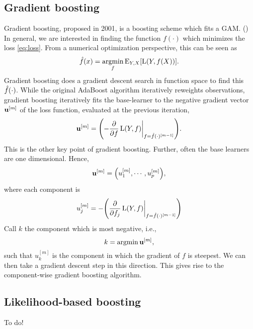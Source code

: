 \subsection{Gradient boosting}
Gradient boosting, proposed in 2001, is a boosting scheme which fits a GAM. (\cite{friedman2001}) In general, we are interested in finding the function $f(\cdot)$ which minimizes the loss \eqref{eq:loss}. From a numerical optimization perspective, this can be seen as
\begin{equation*}
    \hat{f}(x)=\underset{f}{\operatorname{argmin}}\,{\operatorname{E}_{Y,X}[\operatorname{L}(Y,f(X))]}.
\end{equation*}
Gradient boosting does a gradient descent search in function space to find this $\hat{f}(\cdot)$. While the original AdaBoost algorithm iteratively reweights observations, gradient boosting iteratively fits the base-learner to the negative gradient vector $\mathbf{u}^{[m]}$ of the loss function, evaluated at the previous iteration,
\begin{equation*}
    \u^{[m]}=\p*{-\frac{\pd}{\pd f}\loss(Y,f)\at_{f=\fh(\cdot)^{[m-1]}}}.
\end{equation*}
This is the other key point of gradient boosting. Further, often the base learners are one dimensional. Hence,
\begin{equation*}
    \u^{[m]}=\p*{u_1^{[m]},\cdots,u_p^{[m]}},
\end{equation*}
where each component is
\begin{equation*}
    u_j^{[m]}=-\p*{\frac{\pd}{\pd f_j}\loss(Y,f)\at_{f=\fh(\cdot)^{[m-1]}}}
\end{equation*}
Call $k$ the component which is most negative, i.e.,
\begin{equation*}
    k=\operatorname{argmin}{\mathbf{u}^{[m]}},
\end{equation*}
such that $u_k^{[m]}$ is the component in which the gradient of $f$ is steepest. We can then take a gradient descent step in this direction. This gives rise to the component-wise gradient boosting algorithm.

\subsection{Likelihood-based boosting}
To do!